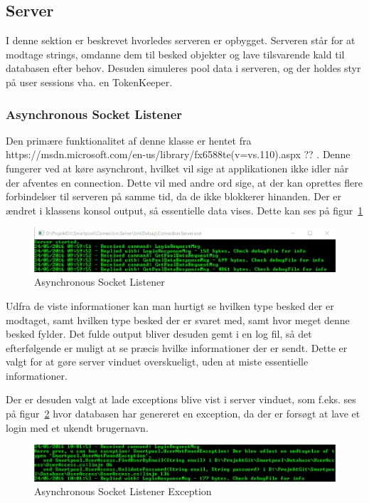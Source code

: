 \subsection{Server}
I denne sektion er beskrevet hvorledes serveren er opbygget. Serveren står for at modtage strings, omdanne dem til besked objekter og lave tilsvarende kald til databasen efter behov. Desuden simuleres pool data i serveren, og der holdes styr på user sessions vha. en TokenKeeper. 

\subsubsection{Asynchronous Socket Listener}
Den primære funktionalitet af denne klasse er hentet fra https://msdn.microsoft.com/en-us/library/fx6588te(v=vs.110).aspx ?? . Denne fungerer ved at køre asynchront, hvilket vil sige at applikationen ikke idler når der afventes en connection. Dette vil med andre ord sige, at der kan oprettes flere forbindelser til serveren på samme tid, da de ikke blokkerer hinanden.
Der er ændret i klassens konsol output, så essentielle data vises. Dette kan ses på figur~\ref{fig:asynchronousSocketListener}

\begin{figure}
	\centering
	\includegraphics[width=0.9\linewidth]{figs/connection/asynchronousSocketListener.png}
	\caption{Asynchronous Socket Listener}
	\label{fig:asynchronousSocketListener}
\end{figure}

Udfra de viste informationer kan man hurtigt se hvilken type besked der er modtaget, samt hvilken type besked der er svaret med, samt hvor meget denne besked fylder. Det fulde output bliver desuden gemt i en log fil, så det efterfølgende er muligt at se præcis hvilke informationer der er sendt. Dette er valgt for at gøre server vinduet overskueligt, uden at miste essentielle informationer.

Der er desuden valgt at lade exceptions blive vist i server vinduet, som f.eks. ses på figur~\ref{fig:asynchronousSocketListenerException} hvor databasen har genereret en exception, da der er forsøgt at lave et login med et ukendt brugernavn.

\begin{figure}
	\centering
	\includegraphics[width=0.9\linewidth]{figs/connection/asynchronousSocketListenerException.png}
	\caption{Asynchronous Socket Listener Exception}
	\label{fig:asynchronousSocketListenerException}
\end{figure}

